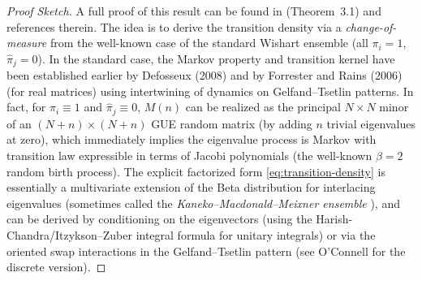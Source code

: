 \documentclass[letterpaper,11pt,oneside,reqno]{article}
\numberwithin{equation}{section}
\theoremstyle{definition}
\begin{document}
\begin{proof}[Proof Sketch]
A full proof of this result can be found in \cite{DiekerWarren2009} (Theorem~3.1) and references therein. The idea is to derive the transition density via a \emph{change-of-measure} from the well-known case of the standard Wishart ensemble (all $\pi_i=1$, $\hat\pi_j=0$). In the standard case, the Markov property and transition kernel have been established earlier by Defosseux (2008) \cite{Defosseux2008} and by Forrester and Rains (2006) \cite{ForresterRains2006} (for real matrices) using intertwining of dynamics on Gelfand--Tsetlin patterns. In fact, for $\pi_i\equiv1$ and $\hat\pi_j\equiv0$, $M(n)$ can be realized as the principal $N\times N$ minor of an $(N+n)\times(N+n)$ GUE random matrix (by adding $n$ trivial eigenvalues at zero), which immediately implies the eigenvalue process is Markov with transition law expressible in terms of Jacobi polynomials (the well-known $\beta=2$ random birth process). The explicit factorized form \eqref{eq:transition-density} is essentially a multivariate extension of the Beta distribution for interlacing eigenvalues (sometimes called the \emph{Kaneko--Macdonald--Meixner ensemble} \cite{Johansson2009}), and can be derived by conditioning on the eigenvectors (using the Harish-Chandra/Itzykson--Zuber integral formula for unitary integrals) or via the oriented swap interactions in the Gelfand--Tsetlin pattern (see O'Connell \cite{OConnell2003} for the discrete version).


\end{proof}
\end{document}
